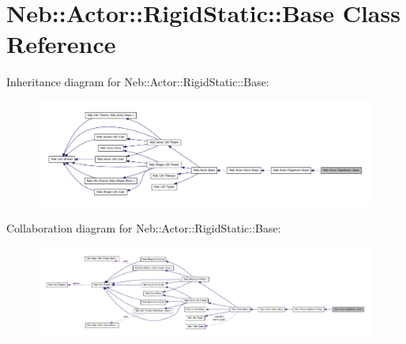 \hypertarget{classNeb_1_1Actor_1_1RigidStatic_1_1Base}{\section{\-Neb\-:\-:\-Actor\-:\-:\-Rigid\-Static\-:\-:\-Base \-Class \-Reference}
\label{classNeb_1_1Actor_1_1RigidStatic_1_1Base}
}


\-Inheritance diagram for \-Neb\-:\-:\-Actor\-:\-:\-Rigid\-Static\-:\-:\-Base\-:\nopagebreak
\begin{figure}[H]
\begin{center}
\leavevmode
\includegraphics[width=350pt]{classNeb_1_1Actor_1_1RigidStatic_1_1Base__inherit__graph}
\end{center}
\end{figure}


\-Collaboration diagram for \-Neb\-:\-:\-Actor\-:\-:\-Rigid\-Static\-:\-:\-Base\-:\nopagebreak
\begin{figure}[H]
\begin{center}
\leavevmode
\includegraphics[width=350pt]{classNeb_1_1Actor_1_1RigidStatic_1_1Base__coll__graph}
\end{center}
\end{figure}
